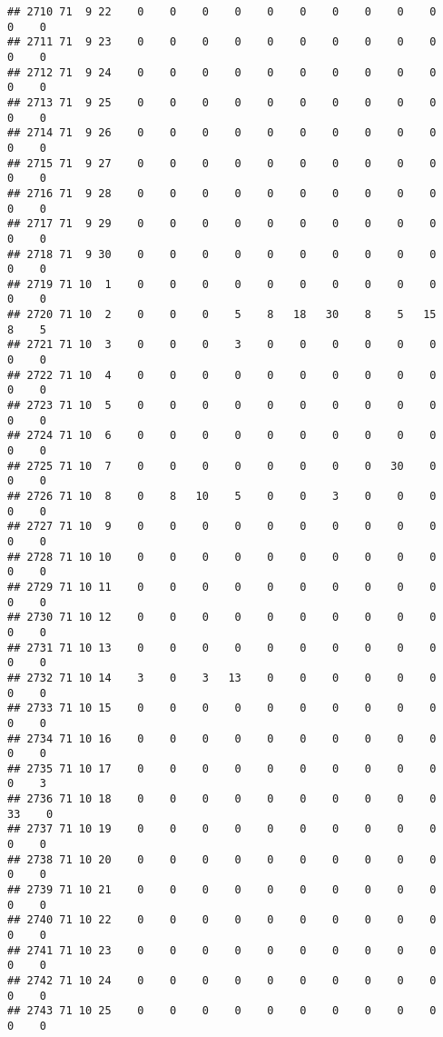 \documentclass[]{article}
\begin{document}
\begin{verbatim}
## 2710 71  9 22    0    0    0    0    0    0    0    0    0    0    0    0
## 2711 71  9 23    0    0    0    0    0    0    0    0    0    0    0    0
## 2712 71  9 24    0    0    0    0    0    0    0    0    0    0    0    0
## 2713 71  9 25    0    0    0    0    0    0    0    0    0    0    0    0
## 2714 71  9 26    0    0    0    0    0    0    0    0    0    0    0    0
## 2715 71  9 27    0    0    0    0    0    0    0    0    0    0    0    0
## 2716 71  9 28    0    0    0    0    0    0    0    0    0    0    0    0
## 2717 71  9 29    0    0    0    0    0    0    0    0    0    0    0    0
## 2718 71  9 30    0    0    0    0    0    0    0    0    0    0    0    0
## 2719 71 10  1    0    0    0    0    0    0    0    0    0    0    0    0
## 2720 71 10  2    0    0    0    5    8   18   30    8    5   15    8    5
## 2721 71 10  3    0    0    0    3    0    0    0    0    0    0    0    0
## 2722 71 10  4    0    0    0    0    0    0    0    0    0    0    0    0
## 2723 71 10  5    0    0    0    0    0    0    0    0    0    0    0    0
## 2724 71 10  6    0    0    0    0    0    0    0    0    0    0    0    0
## 2725 71 10  7    0    0    0    0    0    0    0    0   30    0    0    0
## 2726 71 10  8    0    8   10    5    0    0    3    0    0    0    0    0
## 2727 71 10  9    0    0    0    0    0    0    0    0    0    0    0    0
## 2728 71 10 10    0    0    0    0    0    0    0    0    0    0    0    0
## 2729 71 10 11    0    0    0    0    0    0    0    0    0    0    0    0
## 2730 71 10 12    0    0    0    0    0    0    0    0    0    0    0    0
## 2731 71 10 13    0    0    0    0    0    0    0    0    0    0    0    0
## 2732 71 10 14    3    0    3   13    0    0    0    0    0    0    0    0
## 2733 71 10 15    0    0    0    0    0    0    0    0    0    0    0    0
## 2734 71 10 16    0    0    0    0    0    0    0    0    0    0    0    0
## 2735 71 10 17    0    0    0    0    0    0    0    0    0    0    0    3
## 2736 71 10 18    0    0    0    0    0    0    0    0    0    0   33    0
## 2737 71 10 19    0    0    0    0    0    0    0    0    0    0    0    0
## 2738 71 10 20    0    0    0    0    0    0    0    0    0    0    0    0
## 2739 71 10 21    0    0    0    0    0    0    0    0    0    0    0    0
## 2740 71 10 22    0    0    0    0    0    0    0    0    0    0    0    0
## 2741 71 10 23    0    0    0    0    0    0    0    0    0    0    0    0
## 2742 71 10 24    0    0    0    0    0    0    0    0    0    0    0    0
## 2743 71 10 25    0    0    0    0    0    0    0    0    0    0    0    0

\end{verbatim}
\end{document}
